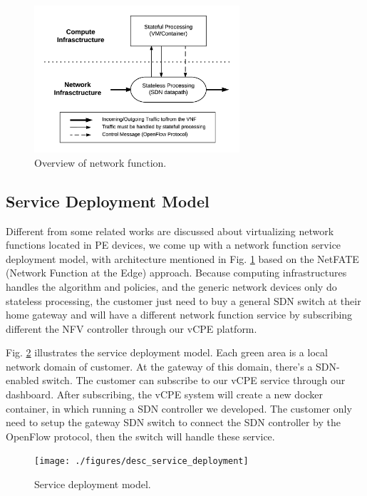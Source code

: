 \documentclass[journal]{IEEEtran}
\begin{document}
\begin{figure}[!t]
\centering
\includegraphics[width=3in]{./figures/desc_nfv_overview}
\caption{Overview of network function.}
\label{fig:desc_nfv_overview}
\end{figure}



\subsection{Service Deployment Model}
Different from some related works are discussed about virtualizing network functions located in PE devices\cite{vcpe-enhance}, we come up with a network function service deployment model, with architecture mentioned in Fig. \ref{fig:desc_nfv_overview} based on the NetFATE (Network Function at the Edge) approach\cite{netfate}. Because computing infrastructures handles the algorithm and policies, and the generic network devices only do stateless processing, the customer just need to buy a general SDN switch at their home gateway and will have a different network function service by subscribing different the NFV controller through our vCPE platform.

Fig. \ref{fig:desc_service_deployment} illustrates the service deployment model. Each green area is a local network domain of customer. At the gateway of this domain, there’s a SDN-enabled switch. The customer can subscribe to our vCPE service through our dashboard. After subscribing, the vCPE system will create a new docker container, in which running a SDN controller we developed. The customer only need to setup the gateway SDN switch to connect the SDN controller by the OpenFlow protocol, then the switch will handle these service.

\begin{figure}[!t]
\centering
\texttt{[image: ./figures/desc\_service\_deployment]}
\caption{Service deployment model.}
\label{fig:desc_service_deployment}
\end{figure}
\end{document}
